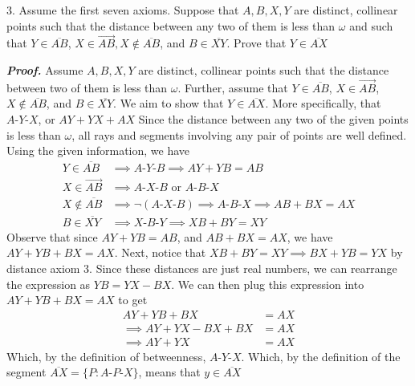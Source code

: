 \documentclass{report}
\begin{document}
    \bigbreak \noindent 
    \begin{mdframed}
        3. Assume the first seven axioms. Suppose that $A,B,X,Y$ are distinct, collinear points such that the distance between any two of them is less than $\omega$ and such that $Y \in \overline{AB} $, $X \in \overrightarrow{AB}, X\not\in \overline{AB}$, and $B \in \overline{XY} $. Prove that $Y \in \overline{AX} $
    \end{mdframed}
    \bigbreak \noindent 
    \textbf{\textit{Proof.}} Assume $A,B,X,Y$ are distinct, collinear points such that the distance between two of them is less than $\omega$. Further, assume that $Y \in \overline{AB}$, $X \in \overrightarrow{AB}$, $X \not\in \overline{AB}$, and $B \in \overline{XY}$. We aim to show that $Y \in \overline{AX}$. More specifically, that $A\text{-}Y\text{-}X$, or $AY + YX + AX$
    \bigbreak \noindent 
    Since the distance between any two of the given points is less than $\omega$, all rays and segments involving any pair of points are well defined. Using the given information, we have
    \begin{align*}
        Y \in \overline{AB} &\implies A\text{-}Y\text{-}B \implies AY + YB = AB \tag{1} \\
        X \in \overrightarrow{AB} &\implies A\text{-}X\text{-}B \text{ or } A\text{-}B\text{-}X \\
        X \not\in \overline{AB} &\implies \neg\left(A\text{-}X\text{-}B\right) \implies A\text{-}B\text{-}X \implies AB + BX = AX \tag{2} \\
        B \in \overline{XY} &\implies X\text{-}B\text{-}Y \implies XB + BY = XY \tag{3}
    \end{align*}
    Observe that since $AY + YB = AB$, and $AB + BX = AX$, we have $AY + YB + BX = AX$. Next, notice that $XB + BY = XY \implies BX + YB = YX$ by distance axiom 3. Since these distances are just real numbers, we can rearrange the expression as $YB = YX - BX$. We can then plug this expression into $AY + YB + BX = AX $ to get
    \begin{align*}
        AY + YB + BX &= AX \\
        \implies AY + YX - BX + BX &= AX \\
        \implies AY + YX &= AX
    \end{align*}
    Which, by the definition of betweenness, $A\text{-}Y\text{-}X$. Which, by the definition of the segment $\overline{AX} = \{P: A\text{-}P\text{-}X\}$, means that $y \in \overline{AX}$ \endpf
\end{document}
